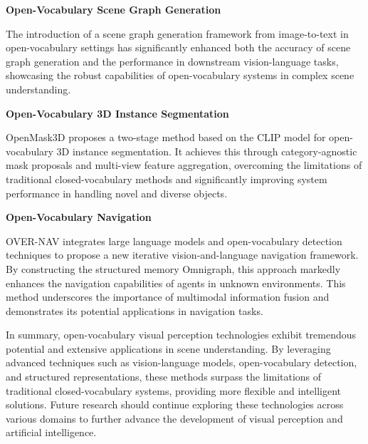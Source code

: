 \textbf{Open-Vocabulary Scene Graph Generation}

The introduction of a scene graph generation framework from image-to-text in open-vocabulary settings has significantly enhanced both the accuracy of scene graph generation and the performance in downstream vision-language tasks, showcasing the robust capabilities of open-vocabulary systems in complex scene understanding.

\textbf{Open-Vocabulary 3D Instance Segmentation}

OpenMask3D proposes a two-stage method based on the CLIP model for open-vocabulary 3D instance segmentation. It achieves this through category-agnostic mask proposals and multi-view feature aggregation, overcoming the limitations of traditional closed-vocabulary methods and significantly improving system performance in handling novel and diverse objects.

\textbf{Open-Vocabulary Navigation}

OVER-NAV integrates large language models and open-vocabulary detection techniques to propose a new iterative vision-and-language navigation framework. By constructing the structured memory Omnigraph, this approach markedly enhances the navigation capabilities of agents in unknown environments. This method underscores the importance of multimodal information fusion and demonstrates its potential applications in navigation tasks.


In summary, open-vocabulary visual perception technologies exhibit tremendous potential and extensive applications in scene understanding. By leveraging advanced techniques such as vision-language models, open-vocabulary detection, and structured representations, these methods surpass the limitations of traditional closed-vocabulary systems, providing more flexible and intelligent solutions. Future research should continue exploring these technologies across various domains to further advance the development of visual perception and artificial intelligence.

